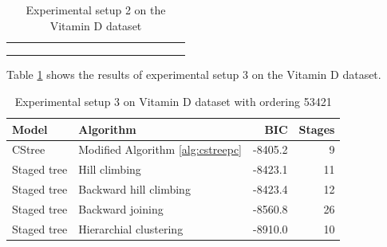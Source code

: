 \documentclass{tufte-book}
\begin{document}
\begin{Definition}
\begin{table}[]
\begin{tabular}{cccccccccccccccc}
                        &                                                                                               &                             &                              &                             &                              &                                 &                              &                             &                                       &                             & \textbf{}                    &  &  &  &  \\
                        &                                                                                               &                             &                              &                             &                              &                                 &                              &                             &                                       &                             &                              &  &  &  &  \\
                        &                                                                                               &                             &                              &                             &                              &                                 &                              &                             &                                       &                             &                              &  &  &  & 

\caption{Experimental setup 2 on the Vitamin D dataset}
			\end{tabular}
\end{table}

Table \ref{tab:orgc0aba4d} shows the results of experimental setup 3 on the Vitamin D dataset.

\begin{table}[htbp]
\caption{\label{tab:orgc0aba4d}Experimental setup 3 on Vitamin D dataset with ordering 53421}
\centering
\begin{tabular}{l|l|r|r}
\hline
Model & Algorithm & BIC & Stages\\
\hline
CStree & Modified Algorithm \ref{alg:cstreepc} & -8405.2 & 9\\
Staged tree & Hill climbing & -8423.1 & 11\\
Staged tree & Backward hill climbing & -8423.4 & 12\\
Staged tree & Backward joining & -8560.8 & 26\\
Staged tree & Hierarchial clustering & -8910.0 & 10\\
\end{tabular}
\end{table}


\end{Definition}
\end{document}
